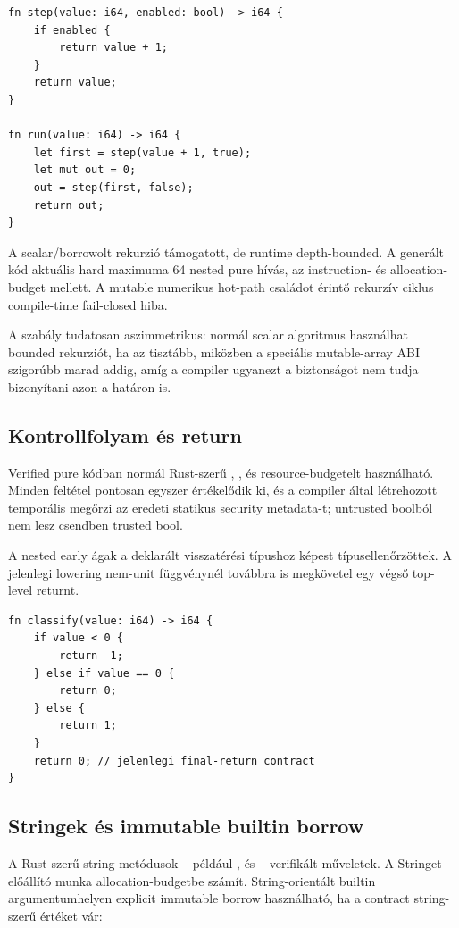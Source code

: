 \begin{lstlisting}[language=Velran]
fn step(value: i64, enabled: bool) -> i64 {
    if enabled {
        return value + 1;
    }
    return value;
}

fn run(value: i64) -> i64 {
    let first = step(value + 1, true);
    let mut out = 0;
    out = step(first, false);
    return out;
}
\end{lstlisting}

A scalar/borrowolt rekurzió támogatott, de runtime depth-bounded. A generált kód aktuális hard maximuma 64 nested pure hívás, az instruction- és allocation-budget mellett. A mutable numerikus hot-path családot érintő rekurzív ciklus compile-time fail-closed hiba.

A szabály tudatosan aszimmetrikus: normál scalar algoritmus használhat bounded rekurziót, ha az tisztább, miközben a speciális mutable-array ABI szigorúbb marad addig, amíg a compiler ugyanezt a biztonságot nem tudja bizonyítani azon a határon is.

\subsection*{Kontrollfolyam és return}

Verified pure kódban normál Rust-szerű , ,  és resource-budgetelt  használható. Minden feltétel pontosan egyszer értékelődik ki, és a compiler által létrehozott temporális megőrzi az eredeti statikus security metadata-t; untrusted boolból nem lesz csendben trusted bool.

A nested early  ágak a deklarált visszatérési típushoz képest típusellenőrzöttek. A jelenlegi lowering nem-unit függvénynél továbbra is megkövetel egy végső top-level returnt.

\begin{lstlisting}[language=Velran]
fn classify(value: i64) -> i64 {
    if value < 0 {
        return -1;
    } else if value == 0 {
        return 0;
    } else {
        return 1;
    }
    return 0; // jelenlegi final-return contract
}
\end{lstlisting}

\subsection*{Stringek és immutable builtin borrow}

A Rust-szerű string metódusok -- például ,  és  -- verifikált műveletek. A Stringet előállító munka allocation-budgetbe számít. String-orientált builtin argumentumhelyen explicit immutable borrow használható, ha a contract string-szerű értéket vár:

